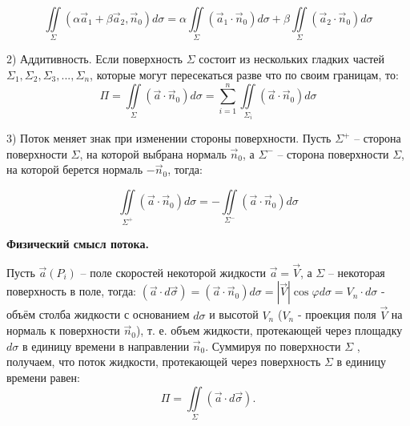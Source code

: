 $$\iint\limits_\Sigma(\alpha \vec{a}_1 + \beta \vec{a}_2, \vec{n}_0)d\sigma = \alpha\iint\limits_\Sigma(\vec{a}_1\cdot
\vec{n}_0) d\sigma + \beta\iint\limits_\Sigma(\vec{a}_2\cdot
\vec{n}_0) d\sigma  $$

2) Аддитивность. Если поверхность $\Sigma$ состоит из нескольких гладких частей $\Sigma_1, \Sigma_2, \Sigma_3, ..., \Sigma_n$, которые могут пересекаться разве что по своим границам, то:
 $$\Pi=\iint\limits_\Sigma(\vec{a}\cdot\vec{n}_0) d\sigma = \sum_{i=1}^{n} \iint\limits_{\Sigma_{i}} (\vec{a}\cdot\vec{n}_0 )d\sigma$$
  
  
3) Поток меняет знак при изменении стороны поверхности. Пусть $\Sigma^+$ – сторона поверхности $\Sigma$, на которой выбрана нормаль $\vec{n}_0$, а $\Sigma^-$ – сторона поверхности $\Sigma$, на которой берется нормаль $-\vec{n}_0$, тогда:

$$\iint\limits_{\Sigma^+}(\vec{a}\cdot
\vec{n}_0) d\sigma = -\iint\limits_{\Sigma^-}(\vec{a}\cdot
\vec{n}_0) d\sigma $$


\begin{center}
	\textbf{Физический смысл потока.}
\end{center}

Пусть $\vec{a}(P_i)$ – поле скоростей некоторой жидкости $\vec{a} = \vec{V}$, а  $\Sigma$ – некоторая поверхность в поле, тогда: $(\vec{a}\cdot d\vec{\sigma}) = (\vec{a}\cdot \vec{n}_0) d\sigma = |\vec{V}|\cos\varphi d\sigma = V_n \cdot d\sigma$ - объём столба жидкости с основанием $d\sigma$ и высотой $V_n$ ($V_n$ - проекция поля $\vec{V}$ на нормаль к поверхности $\vec{n}_0$), т. е. объем
жидкости, протекающей через площадку $d\sigma$ в единицу времени в направлении $\vec{n}_0$. Суммируя по поверхности $\Sigma$ , получаем, что поток жидкости, протекающей через поверхность $\Sigma$ в единицу времени равен:
$$\Pi=\iint\limits_\Sigma(\vec{a} \cdot d \vec{\sigma}).$$

